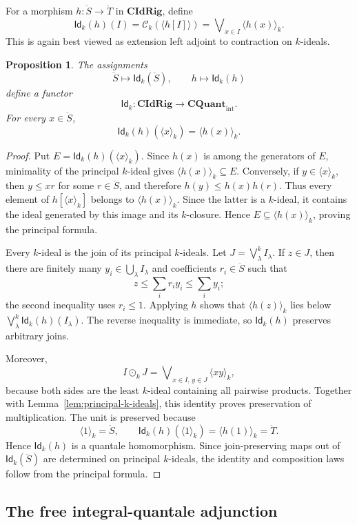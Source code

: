 \documentclass[12pt,leqno]{amsart}
\newcommand{\QuantTop}{\mathbf{CQuant}_{\mathrm{int}}}
\newcommand{\CIdRig}{\mathbf{CIdRig}}
\newcommand{\Idk}{\mathsf{Id}_{k}}
\newtheorem{proposition}[theorem]{Proposition}
\theoremstyle{definition}
\numberwithin{equation}{section}
\theoremstyle{remark}
\def\leq{\leqslant}
\begin{document}
For a morphism \(h\colon\ddot S\to\ddot T\) in \(\CIdRig\), define
\[
\Idk(h)(I)
 =\mathcal C_k(\langle h[I]\rangle)
 =\mathop{\bigvee{}^k}_{x\in I}\langle h(x)\rangle_k.
\]
This is again best viewed as extension left adjoint to contraction on $k$-ideals.

\begin{proposition}\label{prop:Idk-functor}
The assignments
\[
\ddot S\longmapsto\Idk(\ddot S),
\qquad
h\longmapsto\Idk(h)
\]
define a functor
\[
\Idk\colon\CIdRig\longrightarrow\QuantTop.
\]
For every \(x\in\ddot S\),
\[
\Idk(h)(\langle x\rangle_k)=\langle h(x)\rangle_k.
\]
\end{proposition}

\begin{proof}
Put
\(E=\Idk(h)(\langle x\rangle_k)\). Since $h(x)$ is among the generators of $E$, minimality of the principal $k$-ideal gives
\(\langle h(x)\rangle_k\subseteq E\). Conversely, if
\(y\in\langle x\rangle_k\), then \(y\leq xr\) for some $r\in\ddot S$, and therefore
\(h(y)\leq h(x)h(r)\). Thus every element of
\(h[\langle x\rangle_k]\) belongs to \(\langle h(x)\rangle_k\). Since the latter is a $k$-ideal, it contains the ideal generated by this image and its $k$-closure. Hence
\(E\subseteq\langle h(x)\rangle_k\), proving the principal formula.

Every $k$-ideal is the join of its principal $k$-ideals. Let
\(J=\bigvee^k_\lambda I_\lambda\). If \(z\in J\), then there are finitely many
\(y_i\in\bigcup_\lambda I_\lambda\) and coefficients \(r_i\in\ddot S\) such that
\[
z\leq\sum_i r_i y_i\leq\sum_i y_i;
\]
the second inequality uses \(r_i\leq1\). Applying $h$ shows that
\(\langle h(z)\rangle_k\) lies below
\(\bigvee^k_\lambda\Idk(h)(I_\lambda)\). The reverse inequality is immediate, so \(\Idk(h)\) preserves arbitrary joins.

Moreover,
\[
I\odot_kJ=\mathop{\bigvee{}^k}_{x\in I,\,y\in J}\langle xy\rangle_k,
\]
because both sides are the least $k$-ideal containing all pairwise products. Together with Lemma~\ref{lem:principal-k-ideals}, this identity proves preservation of multiplication. The unit is preserved because
\[
\langle1\rangle_k=\ddot S,
\qquad
\Idk(h)(\langle1\rangle_k)=\langle h(1)\rangle_k=\ddot T.
\]
Hence \(\Idk(h)\) is a quantale homomorphism. Since join-preserving maps out of \(\Idk(\ddot S)\) are determined on principal $k$-ideals, the identity and composition laws follow from the principal formula.
\end{proof}

\subsection{The free integral-quantale adjunction}
\end{document}
